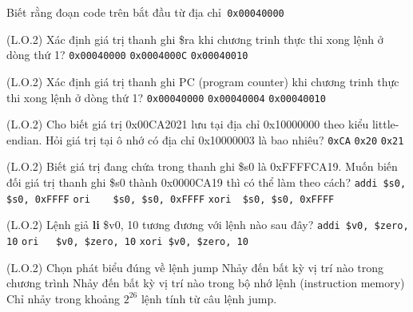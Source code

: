 Biết rằng đoạn code trên bắt đầu từ địa chỉ\lstinline| 0x00040000|

\question (L.O.2) Xác định giá trị thanh ghi \$ra khi chương trinh thực thi xong lệnh ở dòng thứ 1?
\label{S_CallingFunction}
\onech
{\lstinline|0x00040000|}
{}
{\lstinline|0x0004000C|}
{\lstinline|0x00040010|}

\question (L.O.2) Xác định giá trị thanh ghi PC (program counter) khi chương trinh thực thi xong lệnh ở dòng thứ 1?
\label{E_CallingFunction}
\onech
{\lstinline|0x00040000|}
{\lstinline|0x00040004|}
{}
{\lstinline|0x00040010|}

\question (L.O.2) Cho biết giá trị 0x00CA2021 lưu tại địa chỉ 0x10000000 theo kiểu little-endian. Hỏi giá trị tại ô nhớ có địa chỉ 0x10000003 là bao nhiêu?
\onech
{}
{\lstinline|0xCA|}
{\lstinline|0x20|}
{\lstinline|0x21|}

\question (L.O.2) Biết giá trị đang chứa trong thanh ghi \$s0 là 0xFFFFCA19. Muốn biến đối giá trị thanh ghi \$s0 thành 0x0000CA19 thì có thể làm theo cách?
\choice
{\lstinline|addi $s0, $s0, 0xFFFF|}
{\lstinline|ori    $s0, $s0, 0xFFFF|}
{}
{\lstinline|xori  $s0, $s0, 0xFFFF|}

\question (L.O.2) Lệnh giả {\ttfamily \textbf{li} \$v0, 10} tương đương với lệnh nào sau đây?
\choice
{\lstinline|addi $v0, $zero, 10|}
{\lstinline|ori   $v0, $zero, 10|}
{\lstinline|xori $v0, $zero, 10|}
{}

\question (L.O.2) Chọn phát biểu đúng về lệnh jump
\fourch
{Nhảy đến bất kỳ vị trí nào trong chương trình}
{Nhảy đến bất kỳ vị trí nào trong bộ nhớ lệnh (instruction memory)}
{Chỉ nhảy trong khoảng $2^{26}$ lệnh tính từ câu lệnh jump.}
{}